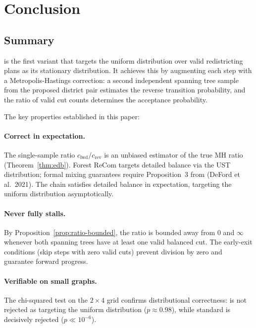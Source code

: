 \section{Conclusion}
\label{sec:conclusion}

\subsection{Summary}

\fr{} is the first \recom{} variant that targets the uniform distribution over
valid redistricting plans as its stationary distribution.
It achieves this by augmenting each \recom{} step with a Metropolis-Hastings
correction: a second independent spanning tree sample from the proposed district
pair estimates the reverse transition probability, and the ratio of valid cut
counts determines the acceptance probability.

The key properties established in this paper:

\paragraph{Correct in expectation.}
The single-sample ratio $c_{\mathrm{fwd}} / c_{\mathrm{rev}}$ is an unbiased
estimator of the true MH ratio (Theorem~\ref{thm:edb}).
Forest ReCom targets detailed balance via the UST distribution; formal mixing
guarantees require Proposition~3 from \citet{mccartan2020} (DeFord et al.\ 2021).
The chain satisfies detailed balance in expectation, targeting the uniform
distribution asymptotically.

\paragraph{Never fully stalls.}
By Proposition~\ref{prop:ratio-bounded}, the ratio is bounded away from 0
and $\infty$ whenever both spanning trees have at least one valid balanced cut.
The early-exit conditions (skip steps with zero valid cuts) prevent division
by zero and guarantee forward progress.

\paragraph{Verifiable on small graphs.}
The chi-squared test on the $2 \times 4$ grid confirms distributional
correctness: \fr{} is not rejected as targeting the uniform distribution
($p \approx 0.98$), while standard \recom{} is decisively rejected
($p \ll 10^{-6}$).

